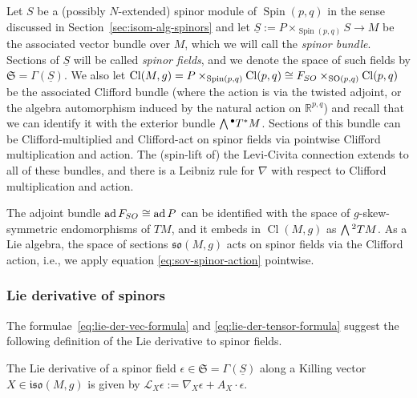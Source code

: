 \documentclass[11pt]{article}
\numberwithin{equation}{section}
\numberwithin{equation}{section}
\newcommand{\fso}{\mathfrak{so}}
\newcommand{\fiso}{\mathfrak{iso}}
\newcommand{\fS}{\mathfrak{S}}
\newcommand{\RR}{\mathbb{R}}
\newcommand{\eL}{\mathscr{L}}
\newcommand{\Sbundle}{\underline{S}}
\newcommand{\Wedge}{\mathchoice{{\textstyle\bigwedge}}{\bigwedge}{\bigwedge}{\bigwedge}}	%
\newcommand{\1}{\mathbbm{1}}
\DeclareMathOperator{\Spin}{Spin}
\DeclareMathOperator{\SO}{SO}
\DeclareMathOperator{\Cl}{Cl}
\DeclareMathOperator{\ad}{ad}
\begin{document}
Let $S$ be a (possibly $N$-extended) spinor module of $\Spin(p,q)$ in the sense discussed in Section~\ref{sec:isom-alg-spinors} and let $\Sbundle:=P\times_{\Spin(p,q)} S\to M$ be the associated vector bundle over $M$, which we will call the \emph{spinor bundle}. Sections of $\Sbundle$ will be called \emph{spinor fields}, and we denote the space of such fields by $\fS=\Gamma(\Sbundle)$. We also let $\Cl(M,g)=P\times_{\Spin(p,q)}\Cl(p,q)\cong F_{\rm SO}\times_{\SO(p,q)}\Cl(p,q)$ be the associated Clifford bundle (where the action is via the twisted adjoint, or the algebra automorphism induced by the natural action on $\RR^{p,q}$) and recall that we can identify it with the exterior bundle $\Wedge^\bullet T^*M$. Sections of this bundle can be Clifford-multiplied and Clifford-act on spinor fields via pointwise Clifford multiplication and action. The (spin-lift of) the Levi-Civita connection extends to all of these bundles, and there is a Leibniz rule for $\nabla$ with respect to Clifford multiplication and action.

The adjoint bundle $\ad F_{\rm SO}\cong\ad P$ can be identified with the space of $g$-skew-symmetric endomorphisms of $TM$, and it embeds in $\Cl(M,g)$ as $\Wedge^2 TM$. As a Lie algebra, the space of sections $\fso(M,g)$ acts on spinor fields via the Clifford action, i.e., we apply equation \eqref{eq:sov-spinor-action} pointwise.

\subsubsection{Lie derivative of spinors}
\label{sec:lie-der-spinors}

The formulae~\eqref{eq:lie-der-vec-formula} and \eqref{eq:lie-der-tensor-formula} suggest the following definition of the Lie derivative to spinor fields.

\begin{Definition}\label{def:lie-der}
	The Lie derivative of a spinor field $\epsilon\in\fS=\Gamma(\Sbundle)$ along a Killing vector $X\in\fiso(M,g)$ is given by
$
		\eL_X \epsilon := \nabla_X \epsilon + A_X\cdot \epsilon$.
\end{Definition}
\end{document}
